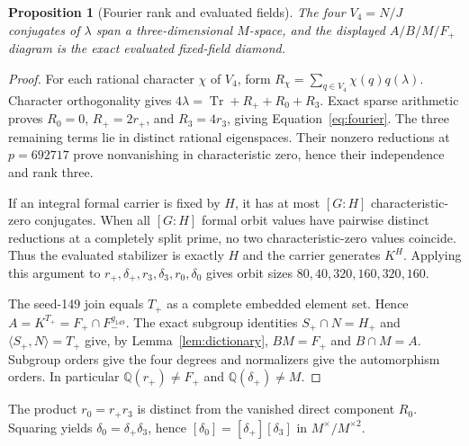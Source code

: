 \documentclass[11pt]{article}
\newtheorem{proposition}[theorem]{Proposition}
\newcommand{\Q}{\mathbb Q}
\begin{document}
\begin{proposition}[Fourier rank and evaluated fields]\label{prop:fourier}
The four $V_4=N/J$ conjugates of $\lambda$ span a three-dimensional $M$-space, and the
displayed $A/B/M/F_+$ diagram is the exact evaluated fixed-field diamond.
\end{proposition}
\begin{proof}
For each rational character $\chi$ of $V_4$, form
$R_\chi=\sum_{q\in V_4}\chi(q)q(\lambda)$.  Character orthogonality gives
$4\lambda=\operatorname{Tr}+R_++R_0+R_3$.  Exact sparse arithmetic proves $R_0=0$,
$R_+=2r_+$, and $R_3=4r_3$, giving Equation~\eqref{eq:fourier}.  The three remaining
terms lie in distinct rational eigenspaces.  Their nonzero reductions at $p=692717$ prove
nonvanishing in characteristic zero, hence their independence and rank three.

If an integral formal carrier is fixed by $H$, it has at most $[G:H]$ characteristic-zero
conjugates.  When all $[G:H]$ formal orbit values have pairwise distinct reductions at a
completely split prime, no two characteristic-zero values coincide.  Thus the evaluated
stabilizer is exactly $H$ and the carrier generates $K^H$.  Applying this argument to
$r_+,\delta_+,r_3,\delta_3,r_0,\delta_0$ gives orbit sizes $80,40,320,160,320,160$.

The seed-149 join equals $T_+$ as a complete embedded element set.  Hence
$A=K^{T_+}=F_+\cap F_-^{g_{149}}$.  The exact subgroup identities
$S_+\cap N=H_+$ and $\langle S_+,N\rangle=T_+$ give, by
Lemma~\ref{lem:dictionary}, $BM=F_+$ and $B\cap M=A$.  Subgroup orders give the four
degrees and normalizers give the automorphism orders.  In particular $\Q(r_+)\ne F_+$ and
$\Q(\delta_+)\ne M$.
\end{proof}

The product $r_0=r_+r_3$ is distinct from the vanished direct component $R_0$.
Squaring yields $\delta_0=\delta_+\delta_3$, hence
$[\delta_0]=[\delta_+][\delta_3]$ in $M^\times/M^{\times2}$.
\end{document}
